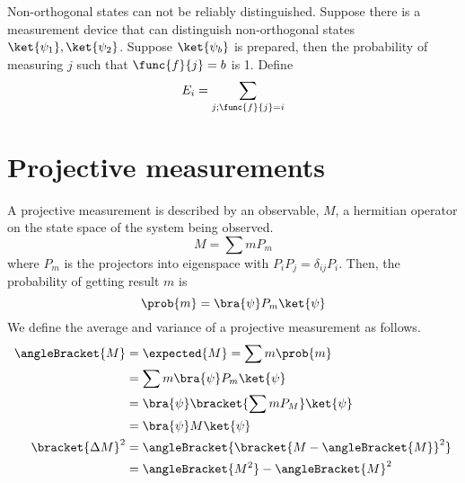 \begin{remark}
    Non-orthogonal states can not be reliably distinguished. Suppose there is a measurement device that can distinguish non-orthogonal states \(\ket{\psi_1}, \ket{\psi_2}\). Suppose \(\ket{\psi_b}\) is prepared, then the probability of measuring \(j\) such that \(\func{f}{j} = b\) is 1. Define 
    \begin{equation*}
        E_i = \sum_{j; \func{f}{j} = i} 
    \end{equation*}
\end{remark}
\section{Projective measurements}
A projective measurement is described by an observable, \(M\), a hermitian operator on the state space of the system being observed.
\begin{equation*}
    M = \sum m P_m
\end{equation*}
where \(P_m\) is the projectors into eigenspace with \(P_i P_j = \delta_{ij} P_i\). Then, the probability of getting result \(m\) is 
\begin{equation*}
    \prob{m} = \bra{\psi} P_m \ket{\psi}
\end{equation*}
We define the average and variance of a projective measurement as follows.
\begin{align*}
    \angleBracket{M} &= \expected{M} = \sum m \prob{m} \\
    &= \sum m \bra{\psi} P_m \ket{\psi} \\
    &= \bra{\psi} \bracket{\sum m P_M} \ket{\psi}\\
    &= \bra{\psi} M \ket{\psi}\\
    \bracket{\Delta M}^2 &= \angleBracket{\bracket{M - \angleBracket{M}}^2}\\
    &= \angleBracket{M^2} - \angleBracket{M}^2
\end{align*}

